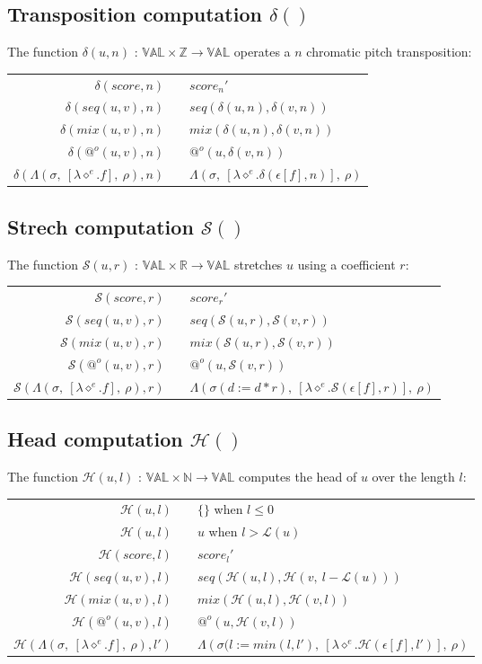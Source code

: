 \documentclass[10pt,a4paper,frenchb]{article}
\makeatletter
\newcommand{\evaltable}[1][$\rightarrow$]	  {\begin{center} \begin{tabular*}{\linewidth}{rc@{ #1 }l}}
\newcommand{\evaltablend}  		{\end{tabular*}\end{center}}
\newcommand{\var}[1]		{\ensuremath{\diamond^#1}}
\newcommand{\val}		{\ensuremath{\mathbb{VAL}}}
\newcommand{\clossym}	{\ensuremath{\Lambda}}
\newcommand{\applyop}	{\ensuremath{@}}
\newcommand{\noredex}	{\ensuremath{\applyop^o}}
\newcommand{\sdomain}[3]{$#1 \times #2 \rightarrow #3$}
\newcommand{\evalsym}			{\ensuremath{\epsilon}}
\newcommand{\envsym}				{\ensuremath{\rho}}
\newcommand{\closure}[4]			{\ensuremath{\clossym\left(#4,\ \left[\lambdaexpr{#1}{#2}\right],\ #3 \right)}}
\newcommand{\evalss}[1]				{\ensuremath{\evalsym\left[#1\right]}}
\newcommand{\apexpr}[1] 		{#1(u, v)}
\newcommand{\lambdaexpr}[2]	{\lambda \var{#1}.#2}
\newcommand{\length}			{\ensuremath{\mathcal L}}
\newcommand{\head}			{\ensuremath{\mathcal H}}
\newcommand{\transp}			{\ensuremath{\delta}}
\renewcommand{\stretch}		{\ensuremath{\mathcal S}}
\newcommand{\bounds}			{\ensuremath{\sigma}}
\newcommand{\sevalHead}[2]				{\ensuremath{\head \left(\evalss{#1},#2\right)}}
\newcommand{\sevalTransp}[2]				{\ensuremath{\transp \left(\evalss{#1},#2\right)}}
\newcommand{\sevalStretch}[2]			{\ensuremath{\stretch \left(\evalss{#1},#2\right)}}
\newcommand{\transpScore}[2]			{\ensuremath{#1_{#2}'}}
\newcommand{\transpSeq}[3]			{\ensuremath{seq\left(\transp\left(#1, #3\right), \transp\left(#2, #3\right)\right)}}
\newcommand{\transpMix}[3]			{\ensuremath{mix\left(\transp\left(#1, #3\right), \transp\left(#2, #3\right)\right)}}
\newcommand{\transpApply}[3]			{\ensuremath{\noredex\left(#1,\transp\left(#2,#3\right)\right)}}
\newcommand{\transpClosure}[5][\envsym]	{\closure{#2}{\sevalTransp{#3}{#5}}{#1}{#4}}
\newcommand{\stretchScore}[2]	{\ensuremath{#1_{#2}'}}
\newcommand{\stretchSeq}[3]		{\ensuremath{seq\left(\stretch\left(#1, #3\right), \stretch\left(#2, #3\right)\right)}}
\newcommand{\stretchMix}[3]		{\ensuremath{mix\left(\stretch\left(#1, #3\right), \stretch\left(#2, #3\right)\right)}}
\newcommand{\stretchApply}[3]	{\ensuremath{\noredex\left(#1, \stretch\left(#2,#3\right)\right)}}
\newcommand{\stretchClosure}[5][\envsym]	{\closure{#2}{\sevalStretch{#3}{#5}}{#1}{#4(d:=d*#5)}}
\newcommand{\headScore}[2]		{\ensuremath{#1_{#2}'}}
\newcommand{\headSeq}[3]			{\ensuremath{seq\left(\head\left(#1, #3\right), \head\left(#2, \ #3 - \length\left(#1\right)\right)\right)}}
\newcommand{\headMix}[3]			{\ensuremath{mix\left(\head\left(#1, #3\right), \head\left(#2, #3\right)\right)}}
\newcommand{\headApply}[3]		{\ensuremath{\noredex\left(#1, \head\left(#2,#3\right)\right)}}
\newcommand{\headClosure}[5][\envsym]		{\closure{#2}{\sevalHead{#3}{#5}}{#1}{#4(l:=min(l,#5)}}
\newcommand{\emptyScore}			{\ensuremath{\{\}}}
\newcommand{\identity}[1]		{\ensuremath{#1}}
\makeatother
\begin{document}
\subsection{Transposition computation $\transp()$}
The function $\transp(u,n)$ :  \sdomain{\val}{\mathbb{Z}}{\val} operates a $n$ chromatic pitch transposition:

\evaltable
 \hline
 $\transp(score,n)$				& & \transpScore{score}{n} \\
 $\transp(\apexpr{seq},n)$		& & \transpSeq{u}{v}{n} \\
 $\transp(\apexpr{mix},n)$ 		& & \transpMix{u}{v}{n} \\
 $\transp(\noredex (u,v),n)$ 	& & \transpApply{u}{v}{n} \\
 $\transp(\closure{e}{f}{\envsym}{\bounds},n)$ 	& & \transpClosure{e}{f}{\bounds}{n} \\
 \hline
\evaltablend

\subsection{Strech computation $\stretch()$}
The function $\stretch(u,r)$ :  \sdomain{\val}{\mathbb{R}}{\val} stretches $u$ using a coefficient $r$:

\evaltable
 \hline
 $\stretch(score,r)$					& & \stretchScore{score}{r} \\
 $\stretch(\apexpr{seq},r)$			& & \stretchSeq{u}{v}{r} \\
 $\stretch(\apexpr{mix},r)$ 			& & \stretchMix{u}{v}{r} \\
 $\stretch(\noredex (u,v),r)$ 		& & \stretchApply{u}{v}{r} \\
 $\stretch(\closure{e}{f}{\envsym}{\bounds},r)$ 	& & \stretchClosure{e}{f}{\bounds}{r} \\
 \hline
\evaltablend

\subsection{Head computation $\head()$}
The function $\head(u,l)$ :  \sdomain{\val}{\mathbb{N}}{\val} computes the head of $u$ over the length $l$:

\evaltable
 \hline
 $\head(u,l)$						& & \emptyScore \: when $l \leq 0$ \\
 $\head(u,l)$						& & \identity{u} \: when $l > \length(u)$ \\
 $\head(score,l)$					& & \headScore{score}{l} \\
 $\head(\apexpr{seq},l)$			& & \headSeq{u}{v}{l} \\
 $\head(\apexpr{mix},l)$ 			& & \headMix{u}{v}{l} \\
 $\head(\noredex (u,v),l)$ 		& & \headApply{u}{v}{l} \\
 $\head(\closure{e}{f}{\envsym}{\bounds},l')$ 	& & \headClosure{e}{f}{\bounds}{l'} \\
 \hline
\evaltablend
\end{document}
